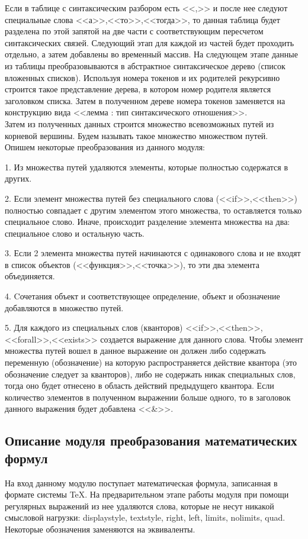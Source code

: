 \documentclass[12pt]{article}
\begin{document}
Если в таблице с синтаксическим разбором  есть <<,>>  и после нее следуют специальные слова <<а>>,<<то>>,<<тогда>>, то данная таблица будет разделена по этой запятой на две части с соответствующим пересчетом синтаксических связей. Следующий этап для каждой из частей будет проходить отдельно, а затем добавлены во временный массив. На следующем этапе данные из таблицы преобразовываются в абстрактное синтаксическое дерево (список вложенных списков). Используя  номера токенов и их родителей рекурсивно строится такое представление дерева, в котором номер родителя является заголовком списка. Затем в полученном дереве номера токенов заменяется на конструкцию вида <<лемма : тип синтаксического отношения>>.\\

Затем из полученных данных строится множество всевозможных путей из корневой вершины. Будем называть такое множество множеством путей. \\

Опишем некоторые преобразования из данного модуля: 

1. Из множества путей удаляются элементы, которые полностью содержатся в других. 

2. Если элемент множества путей без специального слова (<<if>>,<<then>>) полностью совпадает с другим элементом этого множества, то оставляется только специальное слово. Иначе, происходит разделение элемента множества на два: специальное слово и остальную часть. 

3. Если 2 элемента множества путей начинаются с одинакового слова и не входят в список объектов (<<функция>>,<<точка>>), то эти два элемента объединяется. 

4. Cочетания объект и соответствующее определение, объект и обозначение добавляются в множество путей. 

5. Для каждого из специальных слов (кванторов) <<if>>,<<then>>,<<forall>>,<<exists>> создается выражение для данного слова. Чтобы элемент множества путей вошел в данное выражение он должен либо содержать переменную (обозначение) на которую распространяется действие квантора (это обозначение следует за кванторов), либо не содержать никак специальных слов, тогда оно будет отнесено в область действий предыдущего квантора. Если количество элементов в полученном выражении больше одного, то в заголовок данного выражения будет добавлена <<\&>>.

\subsection{Описание модуля преобразования математических формул}
На вход данному модулю поступает математическая формула, записанная в формате системы TeX. На предварительном этапе работы модуля при помощи регулярных выражений из нее удаляются слова, которые не несут никакой смысловой нагрузки:
displaystyle, textstyle, right, left, limits, nolimits, quad. Некоторые обозначения заменяются на эквиваленты.
\end{document}
